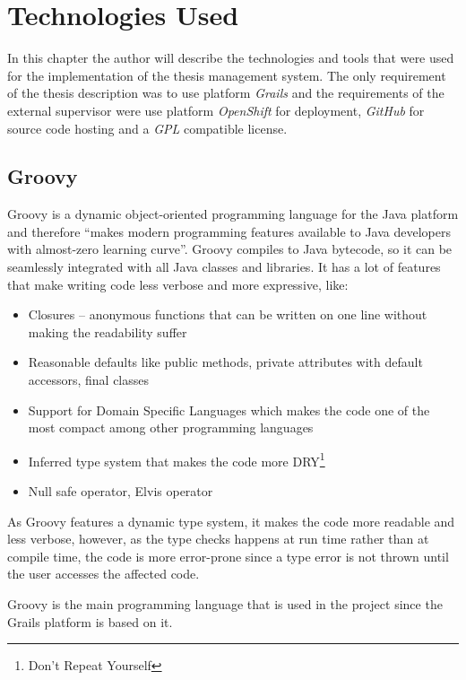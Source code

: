 \chapter{Technologies Used}

In this chapter the author will describe the technologies and tools that were used for the implementation of the thesis management system. The only requirement of the thesis description was to use platform \emph{Grails} and the requirements of the external supervisor were use platform \emph{OpenShift} for deployment, \emph{GitHub} for source code hosting and a \emph{GPL} compatible license.

\section{Groovy}

Groovy is a dynamic object-oriented programming language for the Java platform and therefore ``makes modern programming features available to Java developers with almost-zero learning curve''\cite{groovy-homepage}. Groovy compiles to Java bytecode, so it can be seamlessly integrated with all Java classes and libraries\cite{groovy-homepage}. It has a lot of features that make writing code less verbose and more expressive, like:

\begin{itemize}
    \item Closures -- anonymous functions that can be written on one line without making the readability suffer
    \item Reasonable defaults like public methods, private attributes with default accessors, final classes
    \item Support for Domain Specific Languages which makes the code one of the most compact among other programming languages
    \item Inferred type system that makes the code more DRY\footnote{Don't Repeat Yourself}
    \item Null safe operator, Elvis operator
\end{itemize}

As Groovy features a dynamic type system, it makes the code more readable and less verbose, however, as the type checks happens at run time rather than at compile time, the code is more error-prone since a type error is not thrown until the user accesses the affected code.

Groovy is the main programming language that is used in the project since the Grails platform is based on it.


